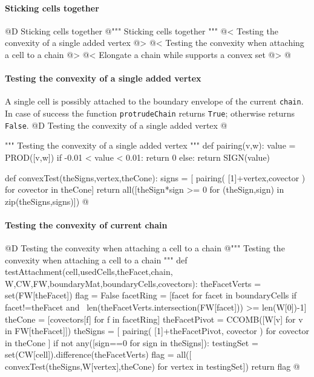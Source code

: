 \documentclass[11pt,oneside]{article}	%
\begin{document}
\paragraph{Sticking cells together}
@D Sticking cells together
@{""" Sticking cells together """
@< Testing the convexity of a single added vertex @>
@< Testing the convexity when attaching a cell to a chain @>
@< Elongate a chain while supports a convex set @>
@}

\paragraph{Testing the convexity of a single added vertex}
A single cell is possibly attached to the boundary envelope of the current \texttt{chain}. In case of success
the function \texttt{protrudeChain} returns \texttt{True}; otherwise returns \texttt{False}. 
@D Testing the convexity of a single added vertex
@{""" Testing the convexity of a single added vertex """
def pairing(v,w):
	value = PROD([v,w])
	if -0.01 < value < 0.01: return 0
	else: return SIGN(value)

def convexTest(theSigns,vertex,theCone):
	signs = [ pairing( [1]+vertex,covector ) for covector in theCone]
	return all([theSign*sign >= 0 for (theSign,sign) in zip(theSigns,signs)])
@}

\paragraph{Testing the convexity of current chain}
@D Testing the convexity when attaching a cell to a chain
@{""" Testing the convexity when attaching a cell to a chain """
def testAttachment(cell,usedCells,theFacet,chain,
					W,CW,FW,boundaryMat,boundaryCells,covectors):
	theFacetVerts = set(FW[theFacet])
	flag = False
	facetRing = [facet for facet in boundaryCells if facet!=theFacet and \
				 len(theFacetVerts.intersection(FW[facet])) >= len(W[0])-1]
	theCone = [covectors[f] for f in facetRing]
	theFacetPivot = CCOMB([W[v] for v in FW[theFacet]])
	theSigns = [ pairing( [1]+theFacetPivot, covector ) for covector in theCone ]
	if not any([sign==0 for sign in theSigns]):
		testingSet = set(CW[cell]).difference(theFacetVerts)
		flag = all([ convexTest(theSigns,W[vertex],theCone) for vertex in testingSet])
	return flag
@}
\end{document}
